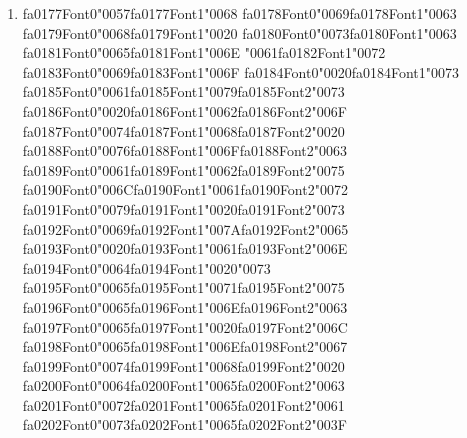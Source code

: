\documentclass[12pt]{article}
\begin{document}
\begin{enumerate}[label=Q\arabic*.]
 \item {\csname fa0177Font0\endcsname\char"0057}{\csname fa0177Font1\endcsname\char"0068} {\csname fa0178Font0\endcsname\char"0069}{\csname fa0178Font1\endcsname\char"0063} {\csname fa0179Font0\endcsname\char"0068}{\csname fa0179Font1\endcsname\char"0020} {\csname fa0180Font0\endcsname\char"0073}{\csname fa0180Font1\endcsname\char"0063} {\csname fa0181Font0\endcsname\char"0065}{\csname fa0181Font1\endcsname\char"006E} {\char"0061}{\csname fa0182Font1\endcsname\char"0072} {\csname fa0183Font0\endcsname\char"0069}{\csname fa0183Font1\endcsname\char"006F} {\csname fa0184Font0\endcsname\char"0020}{\csname fa0184Font1\endcsname\char"0073} {\csname fa0185Font0\endcsname\char"0061}{\csname fa0185Font1\endcsname\char"0079}{\csname fa0185Font2\endcsname\char"0073} {\csname fa0186Font0\endcsname\char"0020}{\csname fa0186Font1\endcsname\char"0062}{\csname fa0186Font2\endcsname\char"006F} {\csname fa0187Font0\endcsname\char"0074}{\csname fa0187Font1\endcsname\char"0068}{\csname fa0187Font2\endcsname\char"0020} {\csname fa0188Font0\endcsname\char"0076}{\csname fa0188Font1\endcsname\char"006F}{\csname fa0188Font2\endcsname\char"0063} {\csname fa0189Font0\endcsname\char"0061}{\csname fa0189Font1\endcsname\char"0062}{\csname fa0189Font2\endcsname\char"0075} {\csname fa0190Font0\endcsname\char"006C}{\csname fa0190Font1\endcsname\char"0061}{\csname fa0190Font2\endcsname\char"0072} {\csname fa0191Font0\endcsname\char"0079}{\csname fa0191Font1\endcsname\char"0020}{\csname fa0191Font2\endcsname\char"0073} {\csname fa0192Font0\endcsname\char"0069}{\csname fa0192Font1\endcsname\char"007A}{\csname fa0192Font2\endcsname\char"0065} {\csname fa0193Font0\endcsname\char"0020}{\csname fa0193Font1\endcsname\char"0061}{\csname fa0193Font2\endcsname\char"006E} {\csname fa0194Font0\endcsname\char"0064}{\csname fa0194Font1\endcsname\char"0020}{\char"0073} {\csname fa0195Font0\endcsname\char"0065}{\csname fa0195Font1\endcsname\char"0071}{\csname fa0195Font2\endcsname\char"0075} {\csname fa0196Font0\endcsname\char"0065}{\csname fa0196Font1\endcsname\char"006E}{\csname fa0196Font2\endcsname\char"0063} {\csname fa0197Font0\endcsname\char"0065}{\csname fa0197Font1\endcsname\char"0020}{\csname fa0197Font2\endcsname\char"006C} {\csname fa0198Font0\endcsname\char"0065}{\csname fa0198Font1\endcsname\char"006E}{\csname fa0198Font2\endcsname\char"0067} {\csname fa0199Font0\endcsname\char"0074}{\csname fa0199Font1\endcsname\char"0068}{\csname fa0199Font2\endcsname\char"0020} {\csname fa0200Font0\endcsname\char"0064}{\csname fa0200Font1\endcsname\char"0065}{\csname fa0200Font2\endcsname\char"0063} {\csname fa0201Font0\endcsname\char"0072}{\csname fa0201Font1\endcsname\char"0065}{\csname fa0201Font2\endcsname\char"0061} {\csname fa0202Font0\endcsname\char"0073}{\csname fa0202Font1\endcsname\char"0065}{\csname fa0202Font2\endcsname\char"003F}

\end{enumerate}
\end{document}
